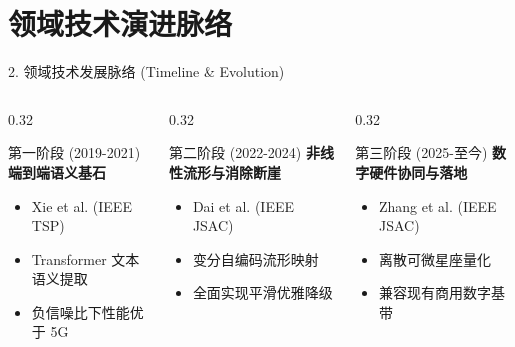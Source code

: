 \documentclass[aspectratio=169,10pt,UTF8]{ctexbeamer}
\begin{document}
\section{领域技术演进脉络}
\begin{frame}{2. 领域技术发展脉络 (Timeline \& Evolution)}
  \begin{columns}[T]
    \begin{column}{0.32\textwidth}
      \begin{alertblock}{第一阶段 (2019-2021)}
        \textbf{端到端语义基石}
        \begin{itemize}
          \item Xie et al. (IEEE TSP)
          \item Transformer 文本语义提取
          \item 负信噪比下性能优于 5G
        \end{itemize}
      \end{alertblock}
    \end{column}
    \begin{column}{0.32\textwidth}
      \begin{block}{第二阶段 (2022-2024)}
        \textbf{非线性流形与消除断崖}
        \begin{itemize}
          \item Dai et al. (IEEE JSAC)
          \item 变分自编码流形映射
          \item 全面实现平滑优雅降级
        \end{itemize}
      \end{block}
    \end{column}
    \begin{column}{0.32\textwidth}
      \begin{exampleblock}{第三阶段 (2025-至今)}
        \textbf{数字硬件协同与落地}
        \begin{itemize}
          \item Zhang et al. (IEEE JSAC)
          \item 离散可微星座量化
          \item 兼容现有商用数字基带
        \end{itemize}
      \end{exampleblock}
    \end{column}
  \end{columns}
\end{frame}

\end{document}
